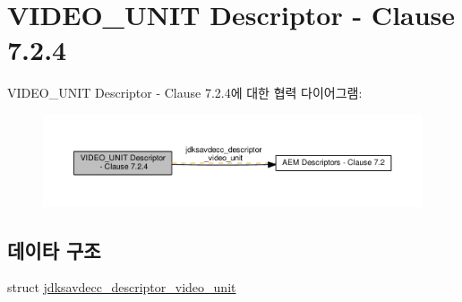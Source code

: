 \hypertarget{group__descriptor__video}{}\section{V\+I\+D\+E\+O\+\_\+\+U\+N\+IT Descriptor -\/ Clause 7.2.4}
\label{group__descriptor__video}
V\+I\+D\+E\+O\+\_\+\+U\+N\+IT Descriptor -\/ Clause 7.2.4에 대한 협력 다이어그램\+:
\nopagebreak
\begin{figure}[H]
\begin{center}
\leavevmode
\includegraphics[width=350pt]{group__descriptor__video}
\end{center}
\end{figure}
\subsection*{데이타 구조}
\begin{DoxyCompactItemize}
\item 
struct \hyperlink{structjdksavdecc__descriptor__video__unit}{jdksavdecc\+\_\+descriptor\+\_\+video\+\_\+unit}
\end{DoxyCompactItemize}
